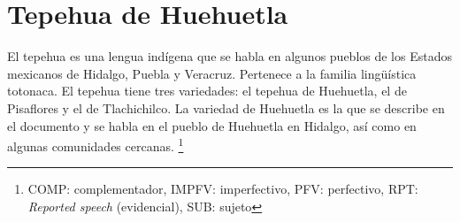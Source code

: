 \section*{Tepehua de Huehuetla}

\noindent El tepehua es una lengua indígena que se habla en algunos pueblos de los Estados mexicanos de Hidalgo, Puebla y Veracruz. Pertenece a la familia lingüística totonaca. El tepehua tiene tres variedades: el tepehua de Huehuetla, el de Pisaflores y el de Tlachichilco. La variedad de Huehuetla es la que se describe en el documento y se habla en el pueblo de Huehuetla en Hidalgo, así como en algunas comunidades cercanas.
\footnote{COMP: complementador, IMPFV: imperfectivo, PFV: perfectivo, RPT: \textit{Reported speech} (evidencial), SUB: sujeto}

\vspace{0.5cm}


